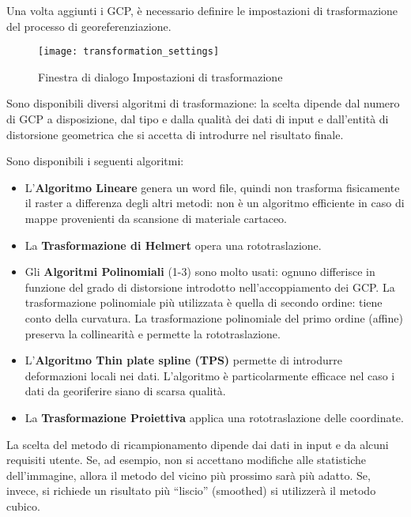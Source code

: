 Una volta aggiunti i GCP, è necessario definire le impostazioni di trasformazione del processo di georeferenziazione. 

\begin{figure}[ht]
\centering
  \texttt{[image: transformation\_settings]}
  \caption{Finestra di dialogo Impostazioni di trasformazione \nixcaption}\label{fig:georef_transform}
\end{figure}


Sono disponibili diversi algoritmi di trasformazione: la scelta dipende dal 
numero di GCP a disposizione, dal tipo e dalla qualità dei dati di input e 
dall'entità di distorsione geometrica che si accetta di introdurre nel 
risultato finale.

Sono disponibili i seguenti algoritmi: 

\begin{itemize}[label=--]
\item L'\textbf{Algoritmo Lineare} genera un word file, quindi non trasforma fisicamente 
il raster a differenza degli altri metodi: non è un algoritmo efficiente in caso 
di mappe provenienti da scansione di materiale cartaceo.
\item La \textbf{Trasformazione di Helmert} opera una rototraslazione.
\item Gli \textbf{Algoritmi Polinomiali} (1-3) sono molto usati: ognuno differisce in funzione 
del grado di distorsione introdotto nell'accoppiamento dei GCP. La trasformazione polinomiale 
più utilizzata è quella di secondo ordine: tiene conto della curvatura. La trasformazione 
polinomiale del primo ordine (affine) preserva la collinearità e permette la rototraslazione.
\item L'\textbf{Algoritmo Thin plate spline (TPS)} permette di introdurre deformazioni locali 
nei dati. L'algoritmo è particolarmente efficace nel caso i dati da georiferire siano di scarsa qualità.
\item La \textbf{Trasformazione Proiettiva} applica una rototraslazione delle coordinate.
\end{itemize}


La scelta del metodo di ricampionamento dipende dai dati in input e da alcuni requisiti utente.
Se, ad esempio, non si accettano modifiche alle statistiche dell'immagine, allora il metodo 
del vicino più prossimo sarà più adatto. Se, invece, si richiede un risultato più ``liscio'' 
(smoothed) si utilizzerà il metodo cubico.

